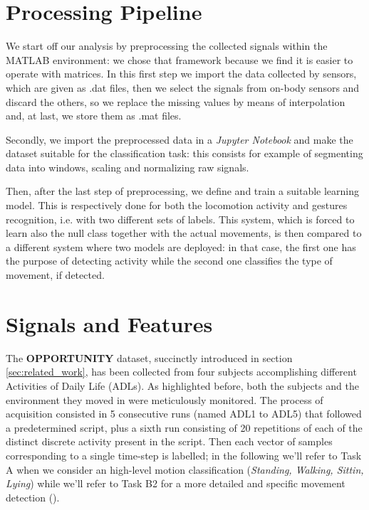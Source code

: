 
\section{Processing Pipeline}
\label{sec:processing_architecture}

We start off our analysis by preprocessing the collected signals within the MATLAB environment: we chose that framework because we find it is easier to operate with matrices. In this first step we import the data collected by sensors, which are given as .dat files, then we select the signals from on-body sensors and discard the others, so we replace the missing values by means of interpolation and, at last, we store them as .mat files.

Secondly, we import the preprocessed data in a \textit{Jupyter Notebook} and make the dataset suitable for the classification task: this consists for example of segmenting data into windows, scaling and normalizing raw signals.

Then, after the last step of preprocessing, we define and train a suitable learning model. This is respectively done for both the locomotion activity and gestures recognition, i.e. with two different sets of labels. This system, which is forced to learn also the null class together with the actual movements, is then compared to a different system where two models are deployed: in that case, the first one has the purpose of detecting activity while the second one classifies the type of movement, if detected. 

\section{Signals and Features}
\label{sec:model}

The \textbf{OPPORTUNITY} dataset, succinctly introduced in section \ref{sec:related_work}, has been collected from four subjects accomplishing different Activities of Daily Life (ADLs). As highlighted before, both the subjects and the environment they moved in were meticulously monitored.
The process of acquisition consisted in 5 consecutive runs (named ADL1 to ADL5) that followed a predetermined script, plus a sixth run consisting of 20 repetitions of each of the distinct discrete activity present in the script. Then each vector of samples corresponding to a single time-step is labelled; in the following we'll refer to Task A when we consider an high-level motion classification (\textit{Standing, Walking, Sittin, Lying}) while we'll refer to Task B2 for a more detailed and specific movement detection ().

